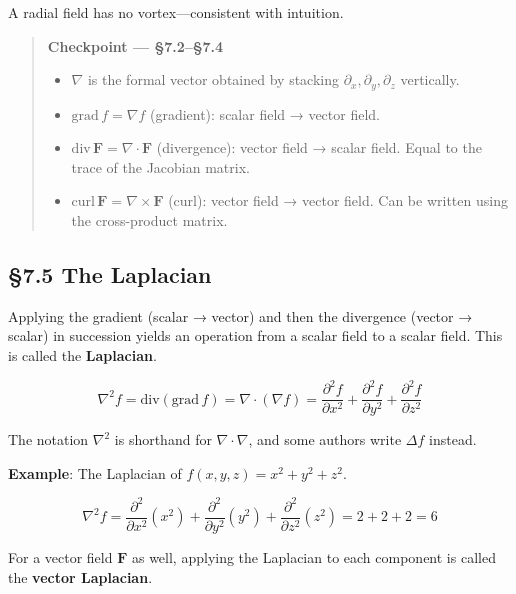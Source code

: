 \documentclass[a4paper,12pt,openany]{book}
\begin{document}
A radial field has no vortex—consistent with intuition.

\begin{quote}
\textbf{Checkpoint — §7.2–§7.4}

\begin{itemize}
\item
  \(\nabla\) is the formal vector obtained by stacking
  \(\partial_x,\partial_y,\partial_z\) vertically.
\item
  \(\mathrm{grad}\,f = \nabla f\) (gradient): scalar field → vector
  field.
\item
  \(\mathrm{div}\,\mathbf{F} = \nabla \cdot \mathbf{F}\) (divergence):
  vector field → scalar field. Equal to the trace of the Jacobian
  matrix.
\item
  \(\mathrm{curl}\,\mathbf{F} = \nabla \times \mathbf{F}\) (curl):
  vector field → vector field. Can be written using the cross-product
  matrix.
\end{itemize}
\end{quote}

\par\vspace{0.35em}\par

\hypertarget{the-laplacian}{%
\subsection{§7.5 The Laplacian}\label{the-laplacian}}

Applying the gradient (scalar → vector) and then the divergence (vector
→ scalar) in succession yields an operation from a scalar field to a
scalar field. This is called the \textbf{Laplacian}.

\[\nabla^2 f = \mathrm{div}(\mathrm{grad}\,f) = \nabla \cdot (\nabla f) = \frac{\partial^2 f}{\partial x^2} + \frac{\partial^2 f}{\partial y^2} + \frac{\partial^2 f}{\partial z^2}\]

The notation \(\nabla^2\) is shorthand for \(\nabla \cdot \nabla\), and
some authors write \(\Delta f\) instead.

\textbf{Example}: The Laplacian of \(f(x,y,z) = x^2 + y^2 + z^2\).

\[\nabla^2 f = \frac{\partial^2}{\partial x^2}(x^2) + \frac{\partial^2}{\partial y^2}(y^2) + \frac{\partial^2}{\partial z^2}(z^2) = 2 + 2 + 2 = 6\]

For a vector field \(\mathbf{F}\) as well, applying the Laplacian to
each component is called the \textbf{vector Laplacian}.
\end{document}
